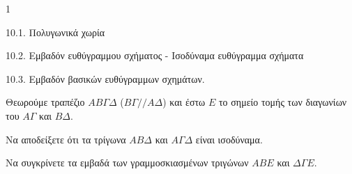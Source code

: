 \begin{ylh}{1}
    \item 10.1. Πολυγωνικά χωρία
    \item 10.2. Εμβαδόν ευθύγραμμου σχήματος - Ισοδύναμα ευθύγραμμα σχήματα
    \item 10.3. Εμβαδόν βασικών ευθύγραμμων σχημάτων.
\end{ylh}
\begin{figure}
\centering
{}
\end{figure}
Θεωρούμε τραπέζιο $ΑΒΓΔ$ ($ΒΓ//ΑΔ$) και έστω $Ε$ το σημείο τομής των διαγωνίων του $ΑΓ$ και $ΒΔ$.
\begin{alist}
\item Να αποδείξετε ότι τα τρίγωνα $ΑΒΔ$ και $ΑΓΔ$ είναι ισοδύναμα. 
\item Να συγκρίνετε τα εμβαδά των γραμμοσκιασμένων τριγώνων $ΑΒΕ$ και $ΔΓΕ$. 
\end{alist}